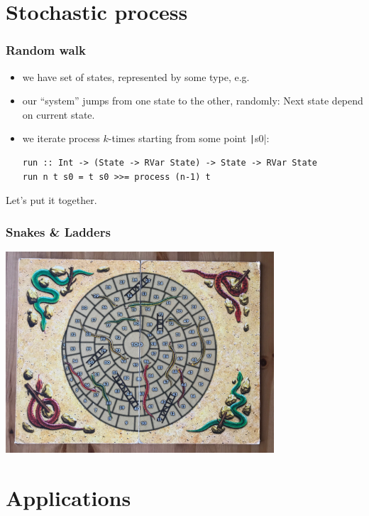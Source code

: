 \documentclass[mathserif, 8pt]{beamer}
\begin{document}
\section{Stochastic process}

\begin{frame}[fragile]
  \frametitle{Random walk}

  \begin{itemize}
  \item we have set of states, represented by some type, e.g.
    \pause
  \item our ``system'' jumps from one state to the other, randomly:
    Next state depend on current state.
    \pause
  \item we iterate process $k$-times starting from some point \texttt|s0|:
\begin{verbatim}
run :: Int -> (State -> RVar State) -> State -> RVar State
run n t s0 = t s0 >>= process (n-1) t
\end{verbatim}
  \end{itemize}

  Let's put it together.
\end{frame}

\begin{frame}
  \frametitle{Snakes \& Ladders}
  \includegraphics[width=10cm]{snakes_ladders.jpg}
\end{frame}

\section{Applications}
\end{document}

